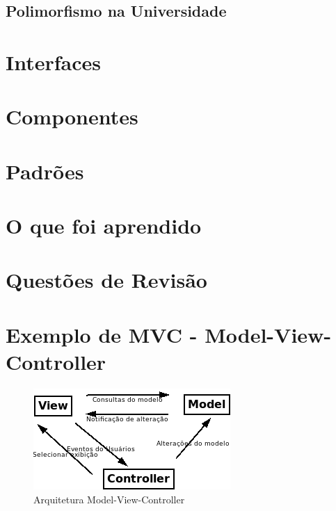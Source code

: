 \documentclass[
	article,			%
	12pt,				%
	openright,
	twoside,			%
	a4paper,			%
	english,			%
	french,
	brazil,				%
	sumario=tradicional
	]{abntex2}
\begin{document}

\subsection{Polimorfismo na Universidade}

\section{Interfaces}

\section{Componentes}

\section{Padrões}

\section{O que foi aprendido}

\section{Questões de Revisão}

\section{Exemplo de MVC - Model-View-Controller}

\begin{figure}[h]
\begin{center}
\includegraphics[scale=0.7]{MVC.png} 
\caption{Arquitetura Model-View-Controller} \label{fig:mvc}
\end{center}
\end{figure}
\end{document}
